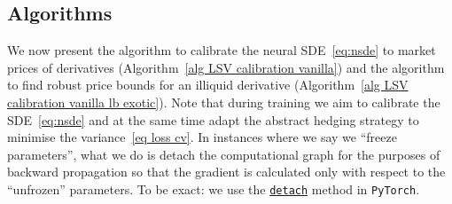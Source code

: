 \subsection{Algorithms} 
We now present the algorithm to calibrate the neural SDE~\eqref{eq:nsde} to market prices of derivatives (Algorithm~\ref{alg LSV calibration vanilla}) and the algorithm to find robust price bounds
for an illiquid derivative (Algorithm~\ref{alg LSV calibration vanilla lb exotic}).
Note that during training we aim to calibrate the SDE~\eqref{eq:nsde} and
at the same time adapt the abstract hedging strategy to minimise the variance~\eqref{eq loss cv}.  
In instances where we say we ``freeze parameters'', what we do is detach the computational graph for the purposes of backward propagation so that the gradient is calculated only with respect to the ``unfrozen'' parameters. 
To be exact: we use the \href{https://pytorch.org/docs/stable/autograd.html?highlight=detach\#torch.Tensor.detach}{\texttt{detach}} method in \texttt{PyTorch}.
%

